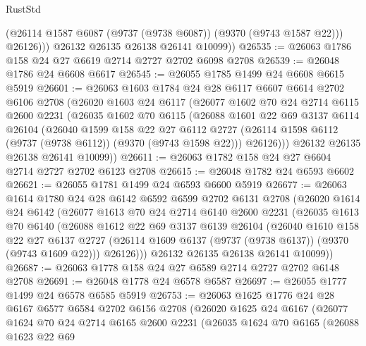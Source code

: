 \begin{lexlean}{RustStd}
\begin{coremodule}
{\begin{coremodule}
{{{{{{{{{{{{{{{{{{{{{{{{{{{{{{{{{{{{{{{              (@26114 @1587 @6087 (@9737 (@9738 @6087)) (@9370 (@9743 @1587 @22)))
              @26126)))
        @26132
        @26135
        @26138
        @26141
        @10099))
@26535 := @26063 @1786 @158 @24 @27 @6619 @2714 @2727 @2702 @6098 @2708
@26539 := @26048 @1786 @24 @6608 @6617
@26545 := @26055 @1785 @1499 @24 @6608 @6615 @5919
@26601 := @26063
    @1603
    @1784
    @24
    @28
    @6117
    @6607
    @6614
    @2702
    @6106
    @2708
    (@26020
      @1603
      @24
      @6117
      (@26077
        @1602
        @70
        @24
        @2714
        @6115
        @2600
        @2231
        (@26035
          @1602
          @70
          @6115
          (@26088
            @1601
            @22
            @69
            @3137
            @6114
            @26104
            (@26040
              @1599
              @158
              @22
              @27
              @6112
              @2727
              (@26114 @1598 @6112 (@9737 (@9738 @6112)) (@9370 (@9743 @1598 @22)))
              @26126)))
        @26132
        @26135
        @26138
        @26141
        @10099))
@26611 := @26063 @1782 @158 @24 @27 @6604 @2714 @2727 @2702 @6123 @2708
@26615 := @26048 @1782 @24 @6593 @6602
@26621 := @26055 @1781 @1499 @24 @6593 @6600 @5919
@26677 := @26063
    @1614
    @1780
    @24
    @28
    @6142
    @6592
    @6599
    @2702
    @6131
    @2708
    (@26020
      @1614
      @24
      @6142
      (@26077
        @1613
        @70
        @24
        @2714
        @6140
        @2600
        @2231
        (@26035
          @1613
          @70
          @6140
          (@26088
            @1612
            @22
            @69
            @3137
            @6139
            @26104
            (@26040
              @1610
              @158
              @22
              @27
              @6137
              @2727
              (@26114 @1609 @6137 (@9737 (@9738 @6137)) (@9370 (@9743 @1609 @22)))
              @26126)))
        @26132
        @26135
        @26138
        @26141
        @10099))
@26687 := @26063 @1778 @158 @24 @27 @6589 @2714 @2727 @2702 @6148 @2708
@26691 := @26048 @1778 @24 @6578 @6587
@26697 := @26055 @1777 @1499 @24 @6578 @6585 @5919
@26753 := @26063
    @1625
    @1776
    @24
    @28
    @6167
    @6577
    @6584
    @2702
    @6156
    @2708
    (@26020
      @1625
      @24
      @6167
      (@26077
        @1624
        @70
        @24
        @2714
        @6165
        @2600
        @2231
        (@26035
          @1624
          @70
          @6165
          (@26088
            @1623
            @22
            @69
}}}}}}}}}}}}}}}}}}}}}}}}}}}}}}}}}}}}}}}
\end{coremodule}}
\end{coremodule}
\end{lexlean}
